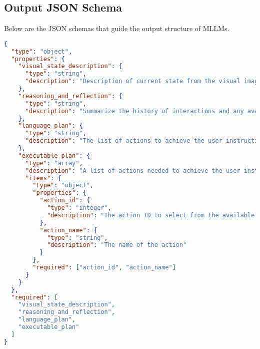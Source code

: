 \subsection{Output JSON Schema}
Below are the JSON schemas that guide the output structure of MLLMs.
\begin{tcolorbox}[colback=gray!5!white, colframe=gray!75!black, 
title={Output JSON Schema for EB-ALFRED, EB-Habitat, and EB-Navigation}, 
boxrule=0.5mm, width=\textwidth, arc=3mm, auto outer arc=true]
\begin{lstlisting}[language=json]
{
  "type": "object",
  "properties": {
    "visual_state_description": {
      "type": "string",
      "description": "Description of current state from the visual image"
    },
    "reasoning_and_reflection": {
      "type": "string",
      "description": "Summarize the history of interactions and any available environmental feedback. Additionally, provide reasoning as to why the last action or plan failed and did not finish the task."
    },
    "language_plan": {
      "type": "string",
      "description": "The list of actions to achieve the user instruction. Each action is started by the step number and the action name."
    },
    "executable_plan": {
      "type": "array",
      "description": "A list of actions needed to achieve the user instruction, with each action having an action ID and a name. Do not output an empty list.",
      "items": {
        "type": "object",
        "properties": {
          "action_id": {
            "type": "integer",
            "description": "The action ID to select from the available actions given by the prompt"
          },
          "action_name": {
            "type": "string",
            "description": "The name of the action"
          }
        },
        "required": ["action_id", "action_name"]
      }
    }
  },
  "required": [
    "visual_state_description", 
    "reasoning_and_reflection", 
    "language_plan", 
    "executable_plan"
  ]
}
\end{lstlisting}
\end{tcolorbox}

